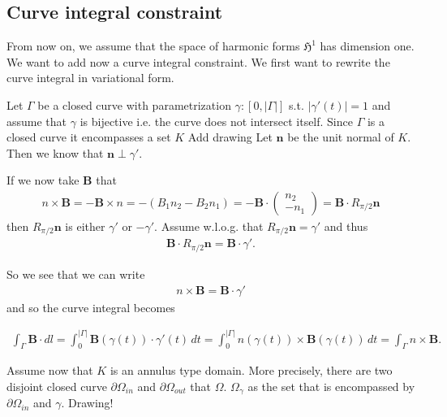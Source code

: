 \documentclass[../master_thesis.tex]{subfiles}
\begin{document}
\subsection{Curve integral constraint}

From now on, we assume that the space of harmonic forms $\mathfrak{H}^1$ has dimension 
one.
We want to add now a curve integral constraint. We first want to rewrite the curve 
integral in variational form. 

Let $\Gamma$ be a closed curve with parametrization $\gamma:[0,|\Gamma|]$ s.t. 
$|\gamma'(t)| = 1$ and assume that $\gamma$ is bijective i.e. the curve does not 
intersect itself. Since $\Gamma$ is a closed curve 
it encompasses a set $K$ {\color{red} Add drawing} Let $\mathbf{n}$ be the 
unit normal of $K$. Then we know that $\mathbf{n} \perp \gamma'$. 

If we now take $\mathbf{B}$ that 
\begin{align*}
    n \times \mathbf{B} =   -\mathbf{B}\times n 
    = - (B_1 n_2 - B_2 n_1) = - \mathbf{B} \cdot \begin{pmatrix}n_2 \\ -n_1 \end{pmatrix}
    = \mathbf{B} \cdot R_{\pi/2}\mathbf{n}
\end{align*}
then $R_{\pi/2} \mathbf{n}$ is either $\gamma'$ or $-\gamma'$. Assume w.l.o.g.
that $R_{\pi/2} \mathbf{n} = \gamma'$ and thus 
\begin{align*}
    \mathbf{B} \cdot R_{\pi/2} \mathbf{n} = \mathbf{B} \cdot \gamma'.
\end{align*}

So we see that we can write 
\begin{align*}
    n \times \mathbf{B} = \mathbf{B} \cdot \gamma'
\end{align*}
and so the curve integral becomes

\begin{align*}
    \int_\Gamma \mathbf{B}\cdot dl= \int_0^{|\Gamma|} \mathbf{B}(\gamma(t)) \cdot \gamma'(t) \, dt 
    = \int_0^{|\Gamma|} n(\gamma(t)) \times \mathbf{B}(\gamma(t)) \, dt 
    = \int_\Gamma n \times \mathbf{B}.
\end{align*}

Assume now that $K$ is an annulus type domain. More precisely, there are two 
disjoint closed curve $\partial \Omega_{in}$ and $\partial \Omega_{out}$ that $\Omega$. 
$\Omega_\gamma$ as the set that is encompassed by $\partial \Omega_{in}$ and $\gamma$.
{\color{red} Drawing!}
\end{document}
